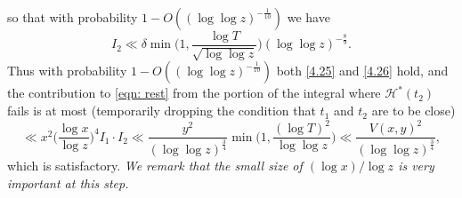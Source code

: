 \documentclass[12pt, notitlepage]{amsart}
\numberwithin{equation}{section}
\theoremstyle{remark}
\theoremstyle{definition}
\theoremstyle{remark}
\numberwithin{equation}{section}
\begin{document}
so that with probability $1-O((\log \log z)^{-\frac 1{10}})$ we have
\begin{equation}
\label{4.26}
 I_2  \ll   \delta \min\Big(1, \frac{\log T }{\sqrt{\log \log z}}  \Big) (\log \log z)^{-\frac 89}. 
\end{equation}
Thus with probability $1-O((\log \log z)^{-\frac 1{10}})$ both \eqref{4.25} and \eqref{4.26} hold, and the contribution to \eqref{eqn: rest} from the portion of the integral where ${\mathcal H}^*(t_2)$ fails is at most (temporarily dropping the condition that $t_1$ and $t_2$ are to be close) 
\[
\ll x^2\Big(\frac{\log x}{\log z}\Big)^4  I_1 \cdot I_2  \ll \frac{y^{2}}{(\log \log z)^{\frac 34}} \min\Big( 1, \frac{(\log T)^2}{\log \log z}\Big) \ll \frac{V(x,y)^2}{(\log \log z)^{\frac 34}},
\] 
which is satisfactory. {\em We remark that the small size of $(\log x)/\log z$ is very important at this step.}
\end{document}
